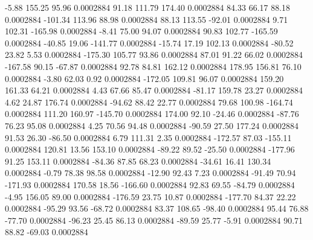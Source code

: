        -5.88      155.25       95.96     0.0002884
       91.18      111.79      174.40     0.0002884
       84.33       66.17       88.18     0.0002884
     -101.34      113.96       88.98     0.0002884
       88.13      113.55      -92.01     0.0002884
        9.71      102.31     -165.98     0.0002884
       -8.41       75.00       94.07     0.0002884
       90.83      102.77     -165.59     0.0002884
      -40.85       19.06     -141.77     0.0002884
      -15.74       17.19      102.13     0.0002884
      -80.52       23.82        5.53     0.0002884
     -175.30      105.77       93.86     0.0002884
       87.01       91.22       66.02     0.0002884
     -167.58       90.15      -67.87     0.0002884
       92.78       84.81      162.12     0.0002884
      178.95      156.81       76.10     0.0002884
       -3.80       62.03        0.92     0.0002884
     -172.05      109.81       96.07     0.0002884
      159.20      161.33       64.21     0.0002884
        4.43       67.66       85.47     0.0002884
      -81.17      159.78       23.27     0.0002884
        4.62       24.87      176.74     0.0002884
      -94.62       88.42       22.77     0.0002884
       79.68      100.98     -164.74     0.0002884
      111.20      160.97     -145.70     0.0002884
      174.00       92.10      -24.46     0.0002884
      -87.76       76.23       95.08     0.0002884
        4.25       70.56       94.48     0.0002884
      -90.59       27.50      177.24     0.0002884
       91.53       26.30      -86.50     0.0002884
        6.79      111.31        2.35     0.0002884
     -172.57       87.03     -155.11     0.0002884
      120.81       13.56      153.10     0.0002884
      -89.22       89.52      -25.50     0.0002884
     -177.96       91.25      153.11     0.0002884
      -84.36       87.85       68.23     0.0002884
      -34.61       16.41      130.34     0.0002884
       -0.79       78.38       98.58     0.0002884
      -12.90       92.43        7.23     0.0002884
      -91.49       70.94     -171.93     0.0002884
      170.58       18.56     -166.60     0.0002884
       92.83       69.55      -84.79     0.0002884
       -4.95      156.05       89.00     0.0002884
     -176.59       23.75       10.87     0.0002884
     -177.70       84.37       22.22     0.0002884
      -95.29       93.56      -68.72     0.0002884
       83.37      108.65      -98.40     0.0002884
       95.44       76.88      -77.70     0.0002884
      -96.23       25.45       86.13     0.0002884
      -89.59       25.77       -5.91     0.0002884
       90.71       88.82      -69.03     0.0002884
